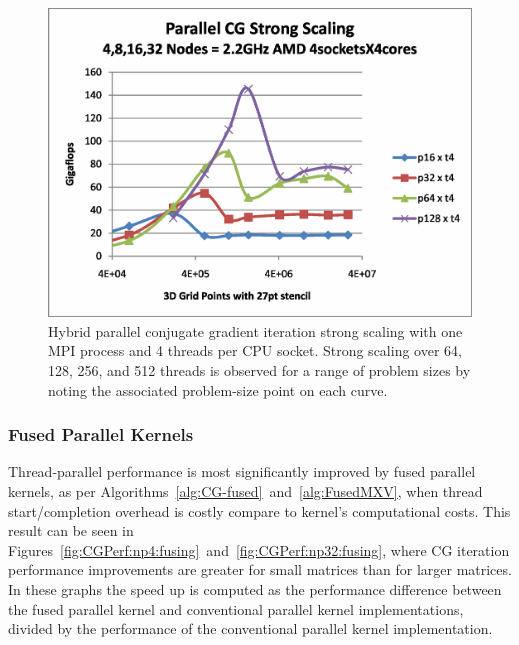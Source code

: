 \begin{figure}[h]
\center
\includegraphics[viewport=1in 0.5in 8.5in 6.5in,angle=0,scale=0.5]{test-hhpccg-intel-11.1-mpi.exe.scaling.no-overlap.2.eps}
\caption{Hybrid parallel conjugate gradient iteration strong scaling with one MPI process and 4 threads per CPU socket.  Strong scaling over 64, 128, 256, and 512 threads is observed for a range of problem sizes by noting the associated problem-size point on each curve.}
\label{fig:CGPerf:scaling}
\end{figure}


\clearpage

\subsubsection{Fused Parallel Kernels}

Thread-parallel performance is most significantly improved by fused parallel kernels, 
as per Algorithms~\ref{alg:CG-fused}~and~\ref{alg:FusedMXV},
when thread start/completion overhead is costly compare to kernel's computational costs.
%
This result can be seen in Figures~\ref{fig:CGPerf:np4:fusing}~and~\ref{fig:CGPerf:np32:fusing},
where CG iteration performance improvements are greater for small matrices than for larger matrices.
%
In these graphs the speed up is computed as the performance difference between the fused parallel kernel and conventional parallel kernel implementations, divided by the performance of the conventional parallel kernel implementation.


